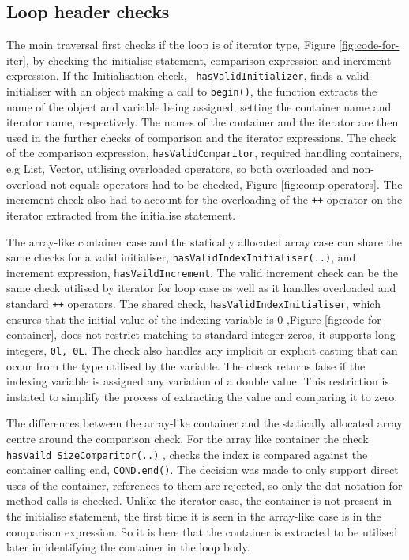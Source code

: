 \documentclass[bsc,frontabs,singlespacing,twoside,parskip,deptreport]{infthesis}
\begin{document}
\subsection{Loop header checks}

The main traversal first checks if the loop is of iterator type, Figure \ref{fig:code-for-iter}, by checking the initialise statement, comparison expression and increment expression. If the Initialisation check, \texttt{ hasValidInitializer}, finds a valid initialiser with an object making a call to \texttt{begin()}, the function extracts the name of the object and variable being assigned, setting the container name and iterator name, respectively. The names of the container and the iterator are then used in the further checks of comparison and the iterator expressions. The check of the comparison expression, \texttt{hasValidComparitor}, required handling containers, e.g List, Vector, utilising overloaded operators, so both overloaded and non-overload not equals operators had to be checked, Figure \ref{fig:comp-operators}. The increment check also had to account for the overloading of the \texttt{++} operator on the iterator extracted from the initialise statement. 


The array-like container case and the statically allocated array case can share the same checks for a valid initialiser, \texttt{hasValidIndexInitialiser(..)}, and increment expression, \texttt{hasVaildIncrement}. The valid increment check can be the same check utilised by iterator for loop case as well as it handles overloaded and standard \texttt{++} operators. The shared check, \texttt{hasValidIndexInitialiser}, which ensures that the initial value of the indexing variable is 0 ,Figure \ref{fig:code-for-container},  does not restrict matching to standard integer zeros, it supports long integers, \texttt{0l, 0L}. The check also handles any implicit or explicit casting that can occur from the type utilised by the variable. The check returns false if the indexing variable is assigned any variation of a double value. This restriction is instated to simplify the process of extracting the value and comparing it to zero.


The differences between the array-like container and the statically allocated array centre around the comparison check. For the array like container the check \texttt{hasVaild SizeComparitor(..)} , checks the index is compared against the container calling end, \texttt{COND.end()}. The decision was made to only support direct uses of the container, references to them are rejected, so only the dot notation for method calls is checked. Unlike the iterator case, the container is not present in the initialise statement, the first time it is seen in the array-like case is in the comparison expression. So it is here that the container is extracted to be utilised later in identifying the container in the loop body.
\end{document}
